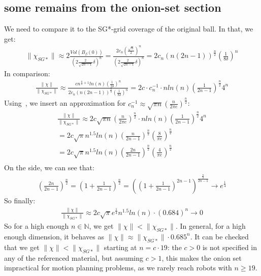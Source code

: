 \subsection{some remains from the onion-set section}
We need to compare it to the SG*-grid coverage of the original ball. In that, we get:
\begin{align}
    \|\chi_{SG*}\|\approx2\frac{Vol(B_{\beta}(0))}{(2\frac{2}{\sqrt{2n-1}}\delta)^n}=\frac{2c_n(\frac{\sqrt{n}}{2})^n}{(2\frac{2}{\sqrt{2n-1}}\delta)^n}=2c_n(n(2n-1))^\frac{n}{2}(\frac{1}{8\delta})^n
\end{align}
In comparison:
\begin{align*}
    \frac{\|\chi\|}{\|\chi_{SG*}\|}\approx\frac{cn^{\frac{n}{2}+1}ln(n)(\frac{1}{2\delta})^n}{2c_n(n(2n-1))^\frac{n}{2}(\frac{1}{8\delta})^n}=2c\cdot c_n^{-1} \cdot nln(n)(\frac{1}{2n-1})^{\frac{n}{2}}4^n
\end{align*}
Using~\cite{tsao2020sample}, we insert an approximation for $c_n^{-1}\approx\sqrt{\pi n}(\frac{n}{2\pi e})^{\frac{n}{2}}$:
\begin{align*}
    \frac{\|\chi\|}{\|\chi_{SG*}\|}\approx 2c \sqrt{\pi n}(\frac{n}{2\pi e})^{\frac{n}{2}}\cdot nln(n)(\frac{1}{2n-1})^{\frac{n}{2}}4^n \\ 
    =2c \sqrt{\pi} n^{1.5}ln(n)(\frac{n}{2n-1})^{\frac{n}{2}}(\frac{8}{\pi e})^{\frac{n}{2}} \\
    =2c \sqrt{\pi} n^{1.5}ln(n)(\frac{2n}{2n-1})^{\frac{n}{2}}(\frac{4}{\pi e})^{\frac{n}{2}} \\
\end{align*}
On the side, we can see that:
\begin{align}
    (\frac{2n}{2n-1})^{\frac{n}{2}}=(1+\frac{1}{2n-1})^{\frac{n}{2}}=((1+\frac{1}{2n-1})^{2n-1})^{\frac{\frac{n}{2}}{2n-1}}\rightarrow e^{\frac{1}{4}}
\end{align}
So finally:
\begin{align*}
    \frac{\|\chi\|}{\|\chi_{SG*}\|}\approx 2c\sqrt{\pi}e^{\frac{1}{4}}n^{1.5}ln(n)\cdot (0.684)^n\rightarrow0
\end{align*}
So for a high enough $n\in\mathbb{N}$, we get $\|\chi\|<\|\chi_{SG*}\|$. In general, for a high enough dimension, it behaves as $\|\chi\|\approx\|\chi_{SG*}\|\cdot 0.685^n$. It can be checked that we get $\|\chi\|<\|\chi_{SG*}\|$ starting at $n=c\cdot 19$: the $c>0$ is not specified in any of the referenced material, but assuming $c>1$, this makes the onion set impractical for motion planning problems, as we rarely reach robots with $n\geq 19$.

